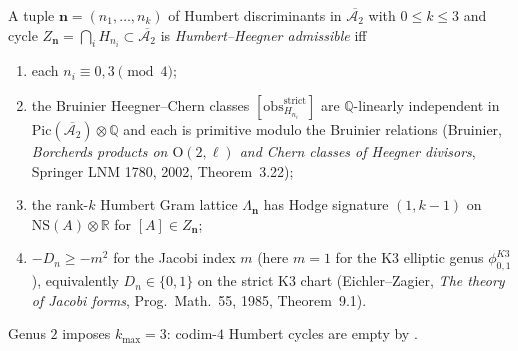 \begin{definition}
\label{def:hh-admissible-cycle-A2}
%
A tuple $\mathbf{n} = (n_1, \ldots, n_k)$ of Humbert discriminants in
$\overline{\mathcal{A}_2}$ with $0 \le k \le 3$ and cycle
$Z_{\mathbf{n}} = \bigcap_i H_{n_i} \subset \overline{\mathcal{A}_2}$
is \emph{Humbert--Heegner admissible} iff
\begin{enumerate}[label=\textup{(A\arabic*)}]
\item each $n_i \equiv 0, 3 \pmod 4$;
\item the Bruinier Heegner--Chern classes $[\mathrm{obs}^{\mathrm{strict}}_{H_{n_i}}]$ are $\mathbb{Q}$-linearly independent in $\mathrm{Pic}(\overline{\mathcal{A}_2}) \otimes \mathbb{Q}$ and each is primitive modulo the Bruinier relations (Bruinier, \emph{Borcherds products on $\mathrm{O}(2, \ell)$ and Chern classes of Heegner divisors}, Springer LNM 1780, 2002, Theorem~3.22);
\item the rank-$k$ Humbert Gram lattice $\Lambda_{\mathbf{n}}$ has Hodge signature $(1, k-1)$ on $\mathrm{NS}(A) \otimes \mathbb{R}$ for $[A] \in Z_{\mathbf{n}}$;
\item $-D_n \ge -m^2$ for the Jacobi index $m$ (here $m = 1$ for the K3 elliptic genus $\phi^{K3}_{0,1}$), equivalently $D_n \in \{0, 1\}$ on the strict K3 chart (Eichler--Zagier, \emph{The theory of Jacobi forms}, Prog.~Math.~55, 1985, Theorem~9.1).
\end{enumerate}
Genus $2$ imposes $k_{\max} = 3$: codim-$4$ Humbert cycles are empty by \cite{VolI}.
\end{definition}

